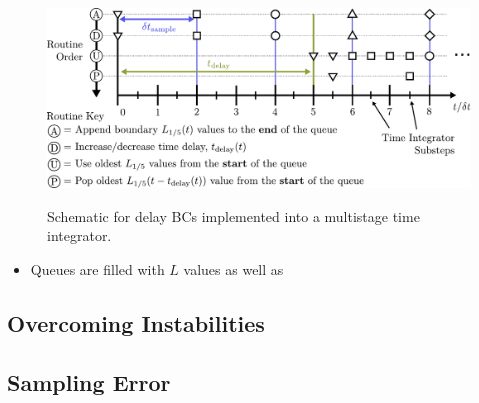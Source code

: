 \begin{figure}[h]
\centering
\includegraphics[scale=0.6]{assets/imgs/delay_bc_code_schematic.pdf}
\label{fig:schematic}
\caption{Schematic for delay BCs implemented into a multistage time integrator. }
\end{figure}


\begin{itemize}
\item Queues are filled with $L$ values as well as 
\end{itemize}



\subsection{Overcoming Instabilities}



\subsection{Sampling Error}




